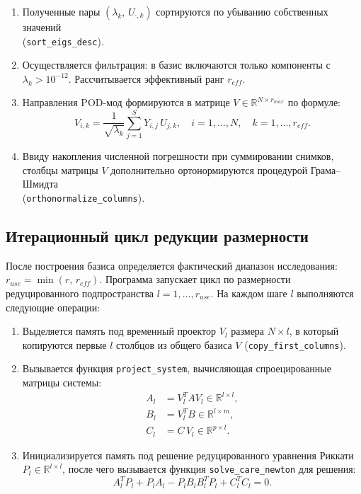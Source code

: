 \documentclass[12pt, a4paper, oneside]{extarticle}
\begin{document}
\begin{enumerate}
    \item Полученные пары $(\lambda_k,\,U_{\cdot,k})$ сортируются по убыванию
    собственных значений \\(\texttt{sort\_eigs\_desc}).

    \item Осуществляется фильтрация: в базис включаются только компоненты с
    $\lambda_k > 10^{-12}$. Рассчитывается эффективный ранг $r_{eff}$.

    \item Направления POD-мод формируются в матрице
    $V \in \mathbb{R}^{N \times r_{max}}$ по формуле:
    \begin{equation*}
        V_{i,k} = \frac{1}{\sqrt{\lambda_k}} \sum_{j=1}^S Y_{i,j}\,U_{j,k},
        \quad i = 1,\dots,N,\quad k = 1,\dots,r_{eff}.
    \end{equation*}

    \item Ввиду накопления численной погрешности при суммировании снимков,
    столбцы матрицы $V$ дополнительно ортонормируются процедурой
    Грама--Шмидта \\(\texttt{orthonormalize\_columns}).
\end{enumerate}

\subsection{Итерационный цикл редукции размерности}

После построения базиса определяется фактический диапазон исследования:\\
$r_{use} = \min(r,\,r_{eff})$. Программа запускает цикл по размерности
редуцированного подпространства $l = 1, \dots, r_{use}$. На каждом шаге $l$
выполняются следующие операции:
\begin{enumerate}
    \item Выделяется память под временный проектор $V_l$ размера $N \times l$,
    в который копируются первые $l$ столбцов из общего базиса $V$
    (\texttt{copy\_first\_columns}).

    \item Вызывается функция \texttt{project\_system}, вычисляющая
    спроецированные матрицы системы:
    \begin{align*}
        A_l &= V_l^T A V_l \in \mathbb{R}^{l \times l}, \\
        B_l &= V_l^T B    \in \mathbb{R}^{l \times m}, \\
        C_l &= C\,V_l     \in \mathbb{R}^{p \times l}.
    \end{align*}

    \item Инициализируется память под решение редуцированного уравнения
    Риккати $P_l \in \mathbb{R}^{l \times l}$, после чего вызывается функция
    \texttt{solve\_care\_newton} для решения:
    \begin{equation*}
        A_l^T P_l + P_l A_l - P_l B_l B_l^T P_l + C_l^T C_l = 0.
    \end{equation*}
\end{enumerate}
\end{document}
